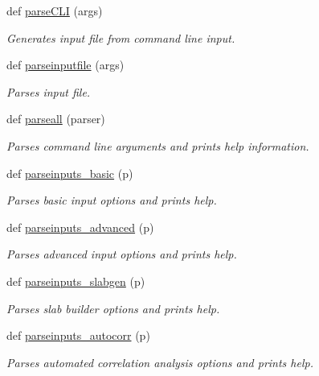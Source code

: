 \begin{DoxyCompactItemize}
def \hyperlink{namespacemolSimplify_1_1Scripts_1_1inparse_a1237624836c2bd63dd4505c3fa9c6bd9}{parse\+C\+LI} (args)
\begin{DoxyCompactList}\small\item\em Generates input file from command line input. \end{DoxyCompactList}\item 
def \hyperlink{namespacemolSimplify_1_1Scripts_1_1inparse_a785d102ca44ed15654769001303bfe36}{parseinputfile} (args)
\begin{DoxyCompactList}\small\item\em Parses input file. \end{DoxyCompactList}\item 
def \hyperlink{namespacemolSimplify_1_1Scripts_1_1inparse_a5104aa57a2921d18ecc99221dea8b6d7}{parseall} (parser)
\begin{DoxyCompactList}\small\item\em Parses command line arguments and prints help information. \end{DoxyCompactList}\item 
def \hyperlink{namespacemolSimplify_1_1Scripts_1_1inparse_ac0d05f3a75be1c12787ac51b64d9e36b}{parseinputs\+\_\+basic} (p)
\begin{DoxyCompactList}\small\item\em Parses basic input options and prints help. \end{DoxyCompactList}\item 
def \hyperlink{namespacemolSimplify_1_1Scripts_1_1inparse_a8d3f90f0ab9a2b445ed7acee2c87f382}{parseinputs\+\_\+advanced} (p)
\begin{DoxyCompactList}\small\item\em Parses advanced input options and prints help. \end{DoxyCompactList}\item 
def \hyperlink{namespacemolSimplify_1_1Scripts_1_1inparse_a763932f104eac1f7a337df62d810fc0c}{parseinputs\+\_\+slabgen} (p)
\begin{DoxyCompactList}\small\item\em Parses slab builder options and prints help. \end{DoxyCompactList}\item 
def \hyperlink{namespacemolSimplify_1_1Scripts_1_1inparse_a100ca73698425404272b624a1b6b04e3}{parseinputs\+\_\+autocorr} (p)
\begin{DoxyCompactList}\small\item\em Parses automated correlation analysis options and prints help. \end{DoxyCompactList}\item 

\end{DoxyCompactItemize}
